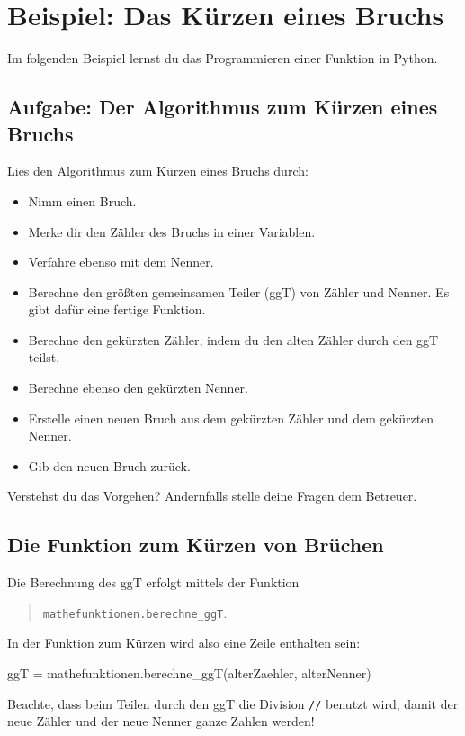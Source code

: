 \section{Beispiel: Das Kürzen eines Bruchs}

Im folgenden Beispiel lernst du das Programmieren einer Funktion in Python.

\subsection*{Aufgabe: Der Algorithmus zum Kürzen eines Bruchs}

Lies den Algorithmus zum Kürzen eines Bruchs durch:

\begin{itemize}
	\item Nimm einen Bruch.
	\item Merke dir den Zähler des Bruchs in einer Variablen.
	\item Verfahre ebenso mit dem Nenner.
	\item Berechne den größten gemeinsamen Teiler (ggT) von Zähler und Nenner. Es gibt dafür eine fertige Funktion.
	\item Berechne den gekürzten Zähler, indem du den alten Zähler durch den ggT teilst. 
	\item Berechne ebenso den gekürzten Nenner.
	\item Erstelle einen neuen Bruch aus dem gekürzten Zähler und dem gekürzten Nenner.
	\item Gib den neuen Bruch zurück.
\end{itemize}

Verstehst du das Vorgehen? Andernfalls stelle deine Fragen dem Betreuer.

\subsection*{Die Funktion zum Kürzen von Brüchen}

Die Berechnung des ggT erfolgt mittels der Funktion
\begin{quote}
\texttt{mathefunktionen.berechne\_ggT}.
\end{quote}
In der Funktion zum Kürzen wird also eine Zeile enthalten sein:

\begin{codePython}
ggT = mathefunktionen.berechne_ggT(alterZaehler, alterNenner)
\end{codePython}

Beachte, dass beim Teilen durch den ggT die Division \texttt{//} benutzt wird, damit der neue Zähler und der neue Nenner ganze Zahlen werden!

